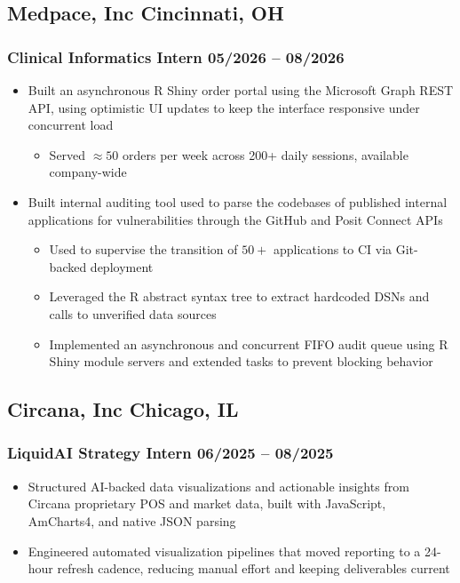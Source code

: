 \documentclass[10pt]{article} %
\begin{document}
\subsection{Medpace, Inc \hfill Cincinnati, OH}
\subsubsection{Clinical Informatics Intern \hfill 05/2026 -- 08/2026}
\begin{itemize}
	\item Built an asynchronous R Shiny order portal using the Microsoft Graph REST API, using optimistic UI updates to keep the interface responsive under concurrent load
	\begin{itemize}
		\item Served $\approx 50$ orders per week across 200+ daily sessions, available company-wide
	\end{itemize}
	\item Built internal auditing tool used to parse the codebases of published internal applications for vulnerabilities through the GitHub and Posit Connect APIs
	\begin{itemize}
		\item Used to supervise the transition of $50+$ applications to CI via Git-backed deployment
		\item Leveraged the R abstract syntax tree to extract hardcoded DSNs and calls to unverified data sources
		\item Implemented an asynchronous and concurrent FIFO audit queue using R Shiny module servers and extended tasks to prevent blocking behavior
	\end{itemize}
\end{itemize}

\subsection{Circana, Inc \hfill Chicago, IL}
\subsubsection{LiquidAI Strategy Intern \hfill 06/2025 -- 08/2025}
\begin{itemize}
	\item Structured AI-backed data visualizations and actionable insights from Circana proprietary POS and market data, built with JavaScript, AmCharts4, and native JSON parsing
	\item Engineered automated visualization pipelines that moved reporting to a 24-hour refresh cadence, reducing manual effort and keeping deliverables current
\end{itemize}
\end{document}
